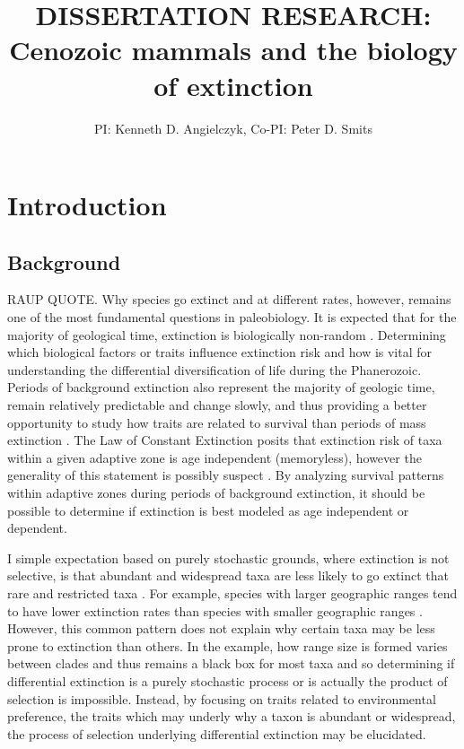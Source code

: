 \documentclass[11pt,letterpaper]{article}
\title{\uppercase{Dissertation Research:}\\ Cenozoic mammals and the biology of extinction}
\author{PI: Kenneth D. Angielczyk, Co-PI: Peter D. Smits}
\date{}
\begin{document}
\setcounter{secnumdepth}{0}
\maketitle
\section{Introduction}
\subsection{Background}
RAUP QUOTE. Why species go extinct and at different rates, however, remains one of the most fundamental questions in paleobiology. It is expected that for the majority of geological time, extinction is biologically non-random \citep{Jablonski1986,Alexander1977,Harnik2011,Johnson2002b,Kitchell1986,Nurnberg2013a,Payne2007}. Determining which biological factors or traits influence extinction risk and how is vital for understanding the differential diversification of life during the Phanerozoic. Periods of background extinction also represent the majority of geologic time, remain relatively predictable and change slowly, and thus providing a better opportunity to study how traits are related to survival than periods of mass extinction \citep{Jablonski1986,Raup1988}. The Law of Constant Extinction \citep{VanValen1973} posits that extinction risk of taxa within a given adaptive zone is age independent (memoryless), however the generality of this statement is possibly suspect \citep{Drake2014,Raup1975,Sepkoski1975,Finnegan2008}. By analyzing survival patterns within adaptive zones during periods of background extinction, it should be possible to determine if extinction is best modeled as age independent or dependent.

I simple expectation based on purely stochastic grounds, where extinction is not selective, is that abundant and widespread taxa are less likely to go extinct that rare and restricted taxa \citep{Raup1991b}. For example, species with larger geographic ranges tend to have lower extinction rates than species with smaller geographic ranges \citep{Jablonski1986,Harnik2013,Nurnberg2013a,Jablonski2003,Roy2009c}. However, this common pattern does not explain why certain taxa may be less prone to extinction than others. In the example, how range size is formed varies between clades and thus remains a black box for most taxa \citep{Jablonski1987} and so determining if differential extinction is a purely stochastic process or is actually the product of selection is impossible. Instead, by focusing on traits related to environmental preference, the traits which may underly why a taxon is abundant or widespread, the process of selection underlying differential extinction may be elucidated.
\end{document}
